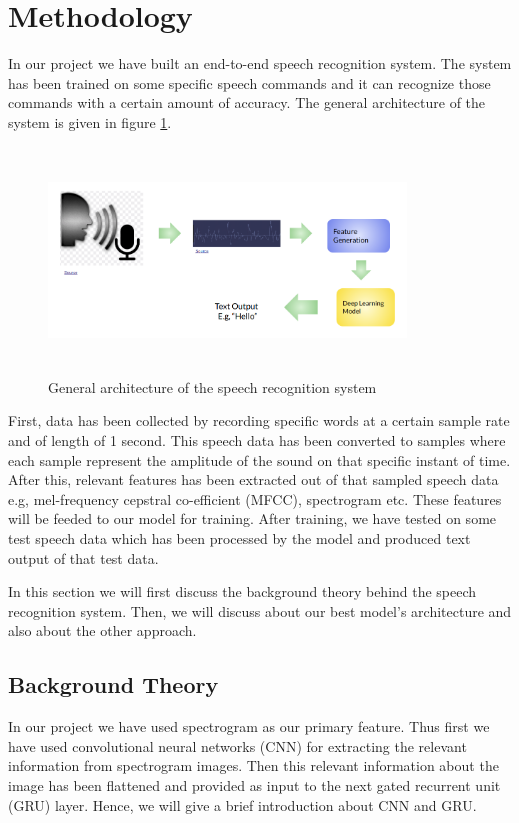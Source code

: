 \section{Methodology}
In our project we have built an end-to-end speech recognition system. The system has been trained on some specific speech commands and it can recognize those commands with a certain amount of accuracy. The general architecture of the system is given in figure \ref{fig1}.
\begin{figure}[!htb]
\centerline{\includegraphics[height=60mm,width=95mm]{img/fig1.png}}
\caption{General architecture of the speech recognition system}
\label{fig1}
\end{figure}
\par First, data has been collected by recording specific words at a certain sample rate and of length of 1 second. This speech data has been converted to samples where each sample represent the amplitude of the sound on that specific instant of time. After this, relevant features has been extracted out of that sampled speech data e.g, mel-frequency cepstral co-efficient (MFCC), spectrogram etc. These features will be feeded to our model for training. After training, we have tested on some test speech data which has been processed by the model and produced text output of that test data. 
\par In this section we will first discuss the background theory behind the speech recognition system. Then, we will discuss about our best model's architecture and also about the other approach.


\subsection{Background Theory}
In our project we have used spectrogram as our primary feature. Thus first we have used convolutional neural networks (CNN) for extracting the relevant information from spectrogram images. Then this relevant information about the image has been flattened and provided as input to the next gated recurrent unit (GRU) layer. Hence, we will give a brief introduction about CNN and GRU. 

